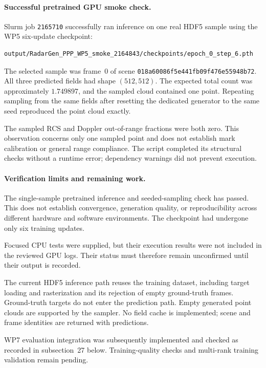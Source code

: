 \documentclass[11pt,a4paper]{article}
\begin{document}
\paragraph{Successful pretrained GPU smoke check.}
Slurm job \texttt{2165710} successfully ran inference on one real
HDF5 sample using the WP5 six-update checkpoint:
\begin{lstlisting}
output/RadarGen_PPP_WP5_smoke_2164843/checkpoints/epoch_0_step_6.pth
\end{lstlisting}
The selected sample was frame~0 of scene
\texttt{018a60086f5e441fb09f476e55948b72}.
All three predicted fields had shape $(512,512)$.
The expected total count was approximately $1.749897$, and the
sampled cloud contained one point. Repeating sampling from the
same fields after resetting the dedicated generator to the same
seed reproduced the point cloud exactly.

The sampled RCS and Doppler out-of-range fractions were both zero.
This observation concerns only one sampled point and does not
establish mark calibration or general range compliance.
The script completed its structural checks without a runtime
error; dependency warnings did not prevent execution.

\paragraph{Verification limits and remaining work.}
The single-sample pretrained inference and seeded-sampling check
has passed. This does not establish convergence, generation
quality, or reproducibility across different hardware and software
environments. The checkpoint had undergone only six training
updates.

Focused CPU tests were supplied, but their execution results were
not included in the reviewed GPU logs. Their status must therefore
remain unconfirmed until their output is recorded.

The current HDF5 inference path reuses the training dataset,
including target loading and rasterization and its rejection of
empty ground-truth frames. Ground-truth targets do not enter the
prediction path. Empty generated point clouds are supported by
the sampler. No field cache is implemented; scene and frame
identities are returned with predictions.

WP7 evaluation integration was subsequently implemented and checked as
recorded in subsection~27 below. Training-quality checks and multi-rank
training validation remain pending.
\end{document}
